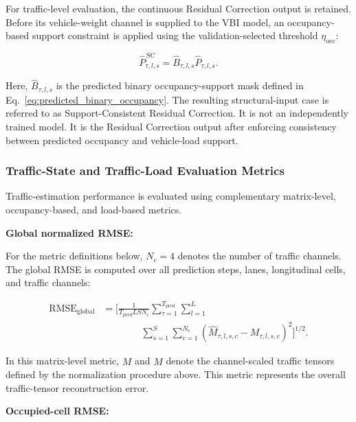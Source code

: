 \documentclass[journal]{IEEEtran}
\begin{document}
For traffic-level
evaluation, the continuous Residual Correction output is retained. Before its
vehicle-weight channel is supplied to the VBI model, an occupancy-based support
constraint is applied using the validation-selected threshold
$\eta_{\mathrm{occ}}$:

\begin{equation}
\widehat{P}^{\,\mathrm{SC}}_{\tau,l,s}
=
\widehat{B}_{\tau,l,s}\widehat{P}_{\tau,l,s}.
\label{eq:support_consistent_load}
\end{equation}

Here, $\widehat{B}_{\tau,l,s}$ is the predicted binary occupancy-support mask
defined in Eq.~\eqref{eq:predicted_binary_occupancy}.
The resulting
structural-input case is referred to as Support-Consistent Residual Correction.
It is not an independently trained model. It is the Residual Correction output after enforcing consistency between predicted occupancy and vehicle-load support.


\subsubsection{Traffic-State and Traffic-Load Evaluation Metrics}

Traffic-estimation
performance is evaluated using complementary matrix-level, occupancy-based, and
load-based metrics.

\textbf{Global normalized RMSE:}

For the metric definitions below, $N_c=4$ denotes the number of traffic channels. The global RMSE is computed over all prediction steps, lanes, longitudinal cells, and traffic channels:

\begin{equation}
\begin{aligned}
\mathrm{RMSE}_{\mathrm{global}}
&=
\Bigg[
\frac{1}
{T_{\mathrm{pred}}LSN_c}
\sum_{\tau=1}^{T_{\mathrm{pred}}}
\sum_{l=1}^{L}
\\
&\qquad\qquad
\sum_{s=1}^{S}
\sum_{c=1}^{N_c}
\left(
\widehat{M}_{\tau,l,s,c}
-
M_{\tau,l,s,c}
\right)^2
\Bigg]^{1/2}.
\end{aligned}
\end{equation}

In this matrix-level metric, $M$ and $\widehat{M}$ denote the channel-scaled traffic tensors defined by the normalization procedure above. This metric represents the overall traffic-tensor reconstruction error.

\textbf{Occupied-cell RMSE:}
\end{document}
